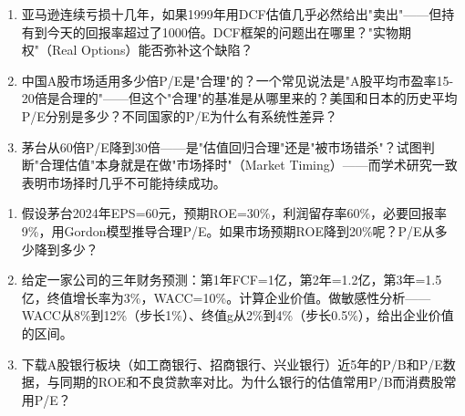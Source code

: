 \documentclass[a4paper,11pt]{ctexbook}
\begin{document}
{\begin{discuss}
\begin{enumerate}
  \item 亚马逊连续亏损十几年，如果1999年用DCF估值几乎必然给出"卖出"——但持有到今天的回报率超过了1000倍。DCF框架的问题出在哪里？"实物期权"（Real Options）能否弥补这个缺陷？
  \item 中国A股市场适用多少倍P/E是"合理"的？一个常见说法是"A股平均市盈率15-20倍是合理的"——但这个"合理"的基准是从哪里来的？美国和日本的历史平均P/E分别是多少？不同国家的P/E为什么有系统性差异？
  \item 茅台从60倍P/E降到30倍——是"估值回归合理"还是"被市场错杀"？试图判断"合理估值"本身就是在做"市场择时"（Market Timing）——而学术研究一致表明市场择时几乎不可能持续成功。
\end{enumerate}
\end{discuss}

\begin{exercises}
\begin{enumerate}
  \item 假设茅台2024年EPS=60元，预期ROE=30\%，利润留存率60\%，必要回报率9\%，用Gordon模型推导合理P/E。如果市场预期ROE降到20\%呢？P/E从多少降到多少？
  \item 给定一家公司的三年财务预测：第1年FCF=1亿，第2年=1.2亿，第3年=1.5亿，终值增长率为3\%，WACC=10\%。计算企业价值。做敏感性分析——WACC从8\%到12\%（步长1\%）、终值g从2\%到4\%（步长0.5\%），给出企业价值的区间。
  \item 下载A股银行板块（如工商银行、招商银行、兴业银行）近5年的P/B和P/E数据，与同期的ROE和不良贷款率对比。为什么银行的估值常用P/B而消费股常用P/E？
\end{enumerate}
\end{exercises}


}
\end{document}
